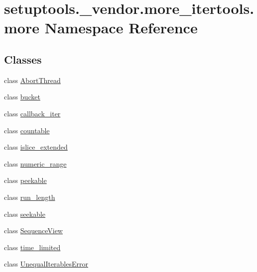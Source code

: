 \hypertarget{namespacesetuptools_1_1__vendor_1_1more__itertools_1_1more}{}\section{setuptools.\+\_\+vendor.\+more\+\_\+itertools.\+more Namespace Reference}
\label{namespacesetuptools_1_1__vendor_1_1more__itertools_1_1more}
\subsection*{Classes}
\begin{DoxyCompactItemize}
\item 
class \hyperlink{classsetuptools_1_1__vendor_1_1more__itertools_1_1more_1_1AbortThread}{Abort\+Thread}
\item 
class \hyperlink{classsetuptools_1_1__vendor_1_1more__itertools_1_1more_1_1bucket}{bucket}
\item 
class \hyperlink{classsetuptools_1_1__vendor_1_1more__itertools_1_1more_1_1callback__iter}{callback\+\_\+iter}
\item 
class \hyperlink{classsetuptools_1_1__vendor_1_1more__itertools_1_1more_1_1countable}{countable}
\item 
class \hyperlink{classsetuptools_1_1__vendor_1_1more__itertools_1_1more_1_1islice__extended}{islice\+\_\+extended}
\item 
class \hyperlink{classsetuptools_1_1__vendor_1_1more__itertools_1_1more_1_1numeric__range}{numeric\+\_\+range}
\item 
class \hyperlink{classsetuptools_1_1__vendor_1_1more__itertools_1_1more_1_1peekable}{peekable}
\item 
class \hyperlink{classsetuptools_1_1__vendor_1_1more__itertools_1_1more_1_1run__length}{run\+\_\+length}
\item 
class \hyperlink{classsetuptools_1_1__vendor_1_1more__itertools_1_1more_1_1seekable}{seekable}
\item 
class \hyperlink{classsetuptools_1_1__vendor_1_1more__itertools_1_1more_1_1SequenceView}{Sequence\+View}
\item 
class \hyperlink{classsetuptools_1_1__vendor_1_1more__itertools_1_1more_1_1time__limited}{time\+\_\+limited}
\item 
class \hyperlink{classsetuptools_1_1__vendor_1_1more__itertools_1_1more_1_1UnequalIterablesError}{Unequal\+Iterables\+Error}
\end{DoxyCompactItemize}
